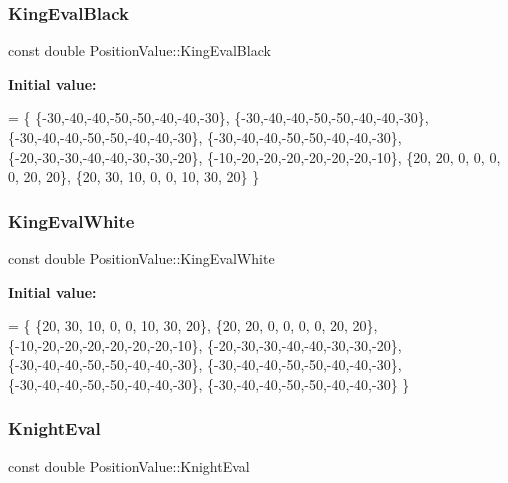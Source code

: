 \subsubsection{\texorpdfstring{King\+Eval\+Black}{KingEvalBlack}}
{\footnotesize\ttfamily const double Position\+Value\+::\+King\+Eval\+Black\hspace{0.3cm}{\ttfamily [static]}}

{\bfseries Initial value\+:}
\begin{DoxyCode}
=
        \{
                \{-30,-40,-40,-50,-50,-40,-40,-30\},
                \{-30,-40,-40,-50,-50,-40,-40,-30\},
                \{-30,-40,-40,-50,-50,-40,-40,-30\},
                \{-30,-40,-40,-50,-50,-40,-40,-30\},
                \{-20,-30,-30,-40,-40,-30,-30,-20\},
                \{-10,-20,-20,-20,-20,-20,-20,-10\},
                \{20, 20,  0,  0,  0,  0, 20, 20\},
                \{20, 30, 10,  0,  0, 10, 30, 20\}
        \}
\end{DoxyCode}
\mbox{\label{class_position_value_aec855fb63f378b211e23377d79a1c7f9}} 
\subsubsection{\texorpdfstring{King\+Eval\+White}{KingEvalWhite}}
{\footnotesize\ttfamily const double Position\+Value\+::\+King\+Eval\+White\hspace{0.3cm}{\ttfamily [static]}}

{\bfseries Initial value\+:}
\begin{DoxyCode}
=
        \{
                \{20, 30, 10,  0,  0, 10, 30, 20\},
                \{20, 20,  0,  0,  0,  0, 20, 20\},
                \{-10,-20,-20,-20,-20,-20,-20,-10\},
                \{-20,-30,-30,-40,-40,-30,-30,-20\},
                \{-30,-40,-40,-50,-50,-40,-40,-30\},
                \{-30,-40,-40,-50,-50,-40,-40,-30\},
                \{-30,-40,-40,-50,-50,-40,-40,-30\},
                \{-30,-40,-40,-50,-50,-40,-40,-30\}
        \}
\end{DoxyCode}
\mbox{\label{class_position_value_a5087b40bba07ffb7f04253cdd22ac70c}} 
\subsubsection{\texorpdfstring{Knight\+Eval}{KnightEval}}
{\footnotesize\ttfamily const double Position\+Value\+::\+Knight\+Eval\hspace{0.3cm}{\ttfamily [static]}}

